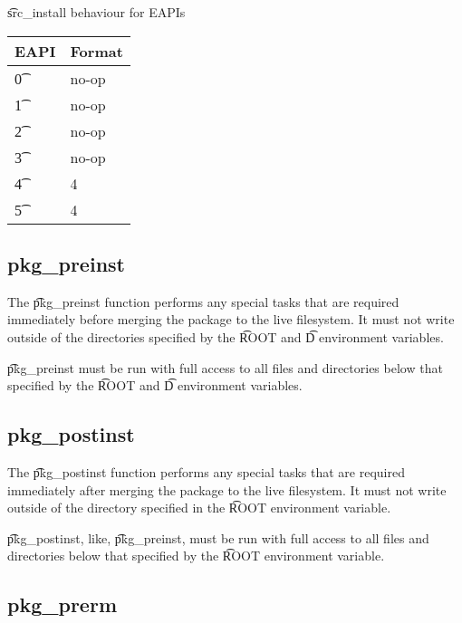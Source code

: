 \begin{centertable}{\t{src\_install} behaviour for EAPIs} \label{tab:src-install-table}
    \begin{tabular}{ l l }
        \toprule
        \multicolumn{1}{c}{\textbf{EAPI}} &
        \multicolumn{1}{c}{\textbf{Format}} \\
        \midrule
    \t{0} & no-op \\
    \t{1} & no-op \\
    \t{2} & no-op \\
    \t{3} & no-op \\
    \t{4} & 4 \\
    \t{5} & 4 \\
    \bottomrule
    \end{tabular}
\end{centertable}

\subsection{pkg\_preinst}
\label{sec:pkg-preinst-function}

The \t{pkg\_preinst} function performs any special tasks that are required immediately before
merging the package to the live filesystem. It must not write outside of the directories specified
by the \t{ROOT} and \t{D} environment variables.

\t{pkg\_preinst} must be run with full access to all files and directories below that specified by
the \t{ROOT} and \t{D} environment variables.

\subsection{pkg\_postinst}
\label{sec:pkg-postinst-function}

The \t{pkg\_postinst} function performs any special tasks that are required immediately after
merging the package to the live filesystem. It must not write outside of the directory specified
in the \t{ROOT} environment variable.

\t{pkg\_postinst}, like, \t{pkg\_preinst}, must be run with full access to all files and directories
below that specified by the \t{ROOT} environment variable.

\subsection{pkg\_prerm}
\label{sec:pkg-prerm-function}


